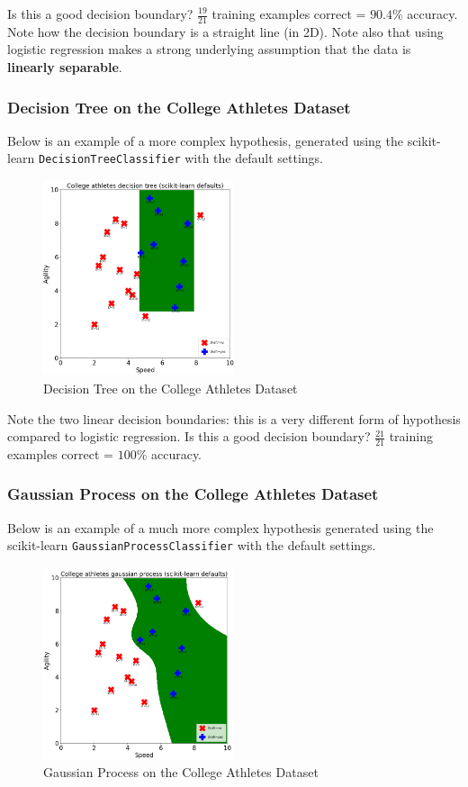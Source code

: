 \documentclass[a4paper,11pt]{article}
\begin{document}
Is this a good decision boundary?
$\frac{19}{21}$ training examples correct = $90.4\%$ accuracy.
Note how the decision boundary is a straight line (in 2D).
Note also that using logistic regression makes a strong underlying assumption that the data is
\textbf{linearly separable}.

\subsubsection{Decision Tree on the College Athletes Dataset}
Below is an example of a more complex hypothesis, generated using the scikit-learn \verb|DecisionTreeClassifier|
with the default settings.

\begin{figure}[H]
    \centering
    \includegraphics[width=0.5\textwidth]{./images/decision_tree_college_athletes.png}
    \caption{Decision Tree on the College Athletes Dataset}
\end{figure}

Note the two linear decision boundaries: this is a very different form of hypothesis compared to logistic
regression.
Is this a good decision boundary?
$\frac{21}{21}$ training examples correct = $100\%$ accuracy.

\subsubsection{Gaussian Process on the College Athletes Dataset}
Below is an example of a much more complex hypothesis generated using the scikit-learn 
\verb|GaussianProcessClassifier| with the default settings.

\begin{figure}[H]
    \centering
    \includegraphics[width=0.5\textwidth]{./images/gaussian_process_college_athletes.png}
    \caption{Gaussian Process on the College Athletes Dataset}
\end{figure}
\end{document}
